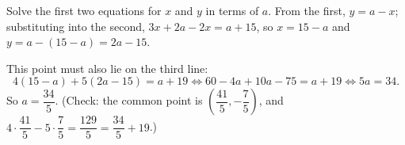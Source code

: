 Solve the first two equations for $x$ and $y$ in terms of $a$. From the first, $y=a-x$; substituting into the second, $3x+2a-2x=a+15$, so $x=15-a$ and $y=a-(15-a)=2a-15$.

This point must also lie on the third line:
\[4(15-a)+5(2a-15)=a+19\iff60-4a+10a-75=a+19\iff5a=34.\]
So $a=\boxed{\dfrac{34}{5}}$. (Check: the common point is $\left(\dfrac{41}{5},-\dfrac75\right)$, and $4\cdot\dfrac{41}{5}-5\cdot\dfrac75=\dfrac{129}{5}=\dfrac{34}{5}+19$.)
